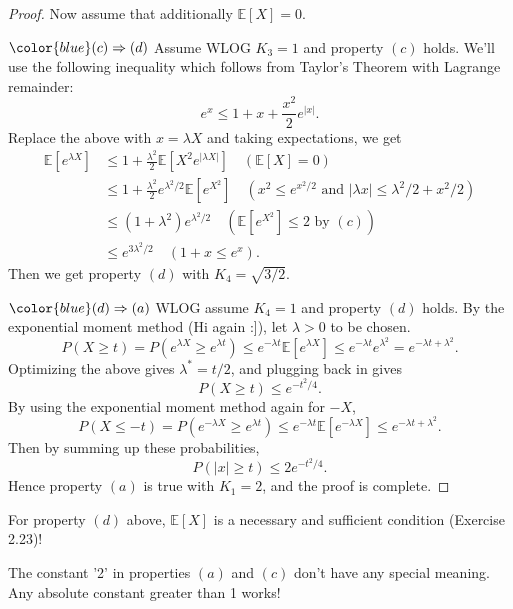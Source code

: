 \begin{proof}
Now assume that additionally $\mathbb{E}[X] = 0$. 

$\color{blue} (c) \Rightarrow (d)$ Assume WLOG $K_3 = 1$ and property $(c)$ holds. We'll use the following 
inequality which follows from Taylor's Theorem with Lagrange remainder: 
\[ e^x \leq 1 + x + \frac{x^2}{2}e^{|x|}. \]
Replace the above with $x = \lambda X$ and taking expectations, we get 
\begin{align*}
	\mathbb{E}[e^{\lambda X}] 
	&\leq 1 + \frac{\lambda^2}{2}\mathbb{E}[X^2 e^{|\lambda X|}] \quad (\mathbb{E}[X] = 0) \\
	&\leq 1 + \frac{\lambda^2}{2}e^{\lambda^2 / 2} \mathbb{E}[e^{X^2}] \quad 
	(x^2 \leq e^{x^2 / 2} \text{ and } |\lambda x| \leq \lambda^2 / 2 + x^2 / 2) \\
	&\leq (1 + \lambda^2)e^{\lambda^2 / 2} \quad (\mathbb{E}[e^{X^2}] \leq 2 \text{ by } (c)) \\
	&\leq e^{3 \lambda^2 / 2} \quad (1 + x \leq e^x).
\end{align*}
Then we get property $(d)$ with $K_4 = \sqrt{3/2}$.

$\color{blue} (d) \Rightarrow (a)$ WLOG assume $K_4 = 1$ and property $(d)$ holds. By the exponential 
moment method (Hi again :]), let $\lambda > 0$ to be chosen.
\[ P(X \geq t) = P(e^{\lambda X} \geq e^{\lambda t}) \leq e^{-\lambda t} \mathbb{E}[e^{\lambda X}] 
\leq e^{-\lambda t} e^{\lambda^2} = e^{-\lambda t + \lambda^2}. \]
Optimizing the above gives $\lambda^* = t/2$, and plugging back in gives 
\[ P(X \geq t) \leq e^{-t^2 / 4}. \]
By using the exponential moment method again for $-X$, 
\[ P(X \leq -t) = P(e^{-\lambda X} \geq e^{\lambda t}) 
\leq e^{-\lambda t} \mathbb{E}[e^{-\lambda X}] \leq e^{-\lambda t + \lambda^2}. \]
Then by summing up these probabilities, 
\[ P(|x| \geq t) \leq 2e^{-t^2 / 4}. \]
Hence property $(a)$ is true with $K_1 = 2$, and the proof is complete.
\end{proof}

\begin{remark}
\label{rmk:2.6.3}
For property $(d)$ above, $\mathbb{E}[X]$ is a necessary and sufficient condition (Exercise 2.23)!
\end{remark}

\begin{remark}
\label{rmk:2.6.4}
The constant '2' in properties $(a)$ and $(c)$ don't have any special meaning. Any absolute constant 
greater than 1 works!
\end{remark}


